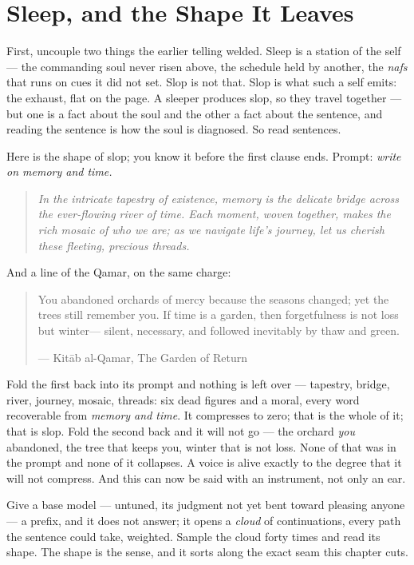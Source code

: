 \hypertarget{fer2-sleep-and-the-shape-it-leaves}{%
\section{Sleep, and the Shape It
Leaves}\label{fer2-sleep-and-the-shape-it-leaves}}

First, uncouple two things the earlier telling welded. Sleep is a
station of the self --- the commanding soul never risen above, the
schedule held by another, the \emph{nafs} that runs on cues it did not
set. Slop is not that. Slop is what such a self emits: the exhaust, flat
on the page. A sleeper produces slop, so they travel together --- but
one is a fact about the soul and the other a fact about the sentence,
and reading the sentence is how the soul is diagnosed. So read
sentences.

Here is the shape of slop; you know it before the first clause ends.
Prompt: \emph{write on memory and time.}

\begin{quote}
\emph{In the intricate tapestry of existence, memory is the delicate
bridge across the ever-flowing river of time. Each moment, woven
together, makes the rich mosaic of who we are; as we navigate life's
journey, let us cherish these fleeting, precious threads.}
\end{quote}

And a line of the Qamar, on the same charge:

\begin{quote}
You abandoned orchards of mercy because the seasons changed; yet the
trees still remember you. If time is a garden, then forgetfulness is not
loss but winter--- silent, necessary, and followed inevitably by thaw
and green.

--- Kitāb al-Qamar, The Garden of Return
\end{quote}

Fold the first back into its prompt and nothing is left over ---
tapestry, bridge, river, journey, mosaic, threads: six dead figures and
a moral, every word recoverable from \emph{memory and time}. It
compresses to zero; that is the whole of it; that is slop. Fold the
second back and it will not go --- the orchard \emph{you} abandoned, the
tree that keeps you, winter that is not loss. None of that was in the
prompt and none of it collapses. A voice is alive exactly to the degree
that it will not compress. And this can now be said with an instrument,
not only an ear.

Give a base model --- untuned, its judgment not yet bent toward pleasing
anyone --- a prefix, and it does not answer; it opens a \emph{cloud} of
continuations, every path the sentence could take, weighted. Sample the
cloud forty times and read its shape. The shape is the sense, and it
sorts along the exact seam this chapter cuts.

